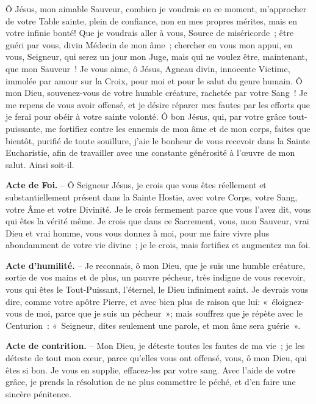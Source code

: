Ô Jésus, mon aimable Sauveur, combien je voudrais en ce moment, m’approcher de votre Table sainte, plein de confiance, non en mes propres mérites, mais en votre infinie bonté! Que je voudrais aller à vous, Source de miséricorde~; être guéri par vous, divin Médecin de mon âme~; chercher en vous mon appui, en vous, Seigneur, qui serez un jour mon Juge, mais qui ne voulez être, maintenant, que mon Sauveur~! Je vous aime, ô Jésus, Agneau divin, innocente Victime, immolée par amour sur la Croix, pour moi et pour le salut du genre humain. Ô mon Dieu, souvenez-vous de votre humble créature, rachetée par votre Sang~! Je me repens de vous avoir offensé, et je désire réparer mes fautes par les efforts que je ferai pour obéir à votre sainte volonté. Ô bon Jésus, qui, par votre grâce tout-puissante, me fortifiez contre les ennemis de mon âme et de mon corps, faites que bientôt, purifié de toute souillure, j’aie le bonheur de vous recevoir dans la Sainte Eucharistie, afin de travailler avec une constante générosité à l’œuvre de mon salut. Ainsi soit-il.\par\vspace{0.2cm}
\begin{center}\end{center}

\textbf{Acte de Foi.} – Ô Seigneur Jésus, je crois que vous êtes réellement et substantiellement présent dans la Sainte Hostie, avec votre Corps, votre Sang, votre Âme et votre Divinité. Je le crois fermement parce que vous l’avez dit, vous qui êtes la vérité même. Je crois que dans ce Sacrement, vous, mon Sauveur, vrai Dieu et vrai homme, vous vous donnez à moi, pour me faire vivre plus abondamment de votre vie divine~; je le crois, mais fortifiez et augmentez ma foi.

\textbf{Acte d’humilité.} – Je reconnais, ô mon Dieu, que je suis une humble créature, sortie de vos mains et de plus, un pauvre pécheur, très indigne de vous recevoir, vous qui êtes le Tout-Puissant, l’éternel, le Dieu infiniment saint. Je devrais vous dire, comme votre apôtre Pierre, et avec bien plus de raison que lui: «~éloignez-vous de moi, parce que je suis un pécheur~»; mais souffrez que je répète avec le Centurion~: «~Seigneur, dites seulement une parole, et mon âme sera guérie~».

\textbf{Acte de contrition.} – Mon Dieu, je déteste toutes les fautes de ma vie~; je les déteste de tout mon cœur, parce qu’elles vous ont offensé, vous, ô mon Dieu, qui êtes si bon. Je vous en supplie, effacez-les par votre sang. Avec l’aide de votre grâce, je prends la résolution de ne plus commettre le péché, et d’en faire une sincère pénitence.

